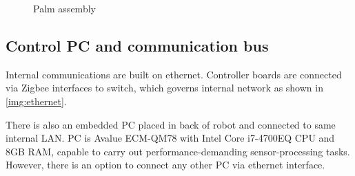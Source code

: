 \documentclass[letterpaper, 10 pt, conference]{ieeeconf}  %
\begin{document}
\begin{figure}[h]
\caption{Palm assembly}
\label{img:wrist}
\end{figure}  

\subsection{Control PC and communication bus}
Internal communications are built on ethernet. Controller boards are connected
via Zigbee interfaces to switch, which governs internal network as shown
in \ref{img:ethernet}.

There is also an embedded PC placed in back of robot and connected to same internal LAN. PC is
Avalue ECM-QM78 with Intel Core i7-4700EQ CPU and 8GB RAM, capable to carry out
performance-demanding sensor-processing tasks. However, there is an option to
connect any other PC via ethernet interface.
\end{document}
